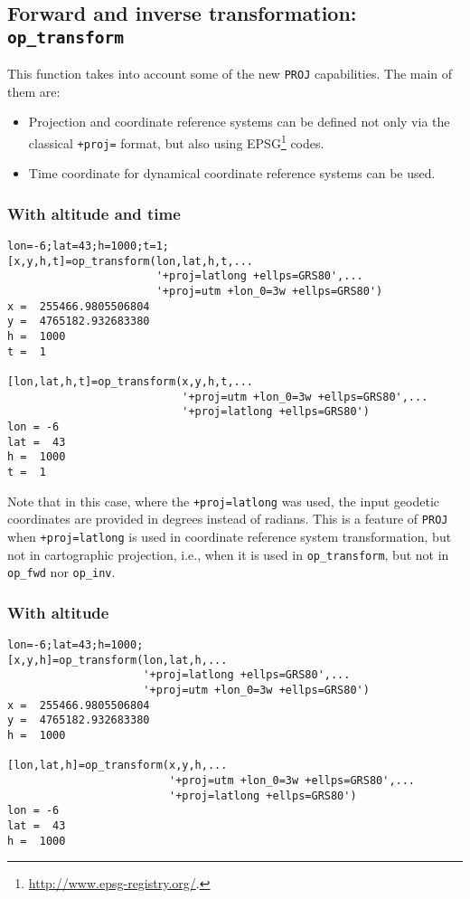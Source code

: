 \documentclass[10pt,a4paper]{article}
\newcommand{\proj}{\texttt{PROJ}}
\begin{document}
\subsection{Forward and inverse transformation: \texttt{op\_transform}}

This function takes into account some of the new \proj{} capabilities. The main
of them are:
\begin{itemize}
\item Projection and coordinate reference systems can be defined not only via
      the classical \texttt{+proj=} format, but also using
      EPSG\footnote{\url{http://www.epsg-registry.org/}.} codes.
\item Time coordinate for dynamical coordinate reference systems can be used.
\end{itemize}

\subsubsection{With altitude and time}

\begin{verbatim}
lon=-6;lat=43;h=1000;t=1;
[x,y,h,t]=op_transform(lon,lat,h,t,...
                       '+proj=latlong +ellps=GRS80',...
                       '+proj=utm +lon_0=3w +ellps=GRS80')
x =  255466.9805506804
y =  4765182.932683380
h =  1000
t =  1

[lon,lat,h,t]=op_transform(x,y,h,t,...
                           '+proj=utm +lon_0=3w +ellps=GRS80',...
                           '+proj=latlong +ellps=GRS80')
lon = -6
lat =  43
h =  1000
t =  1
\end{verbatim}

Note that in this case, where the \texttt{+proj=latlong} was used, the input
geodetic coordinates are provided in degrees instead of radians. This is a
feature of \proj{} when \texttt{+proj=latlong} is used in coordinate reference
system transformation, but not in cartographic projection, i.e., when it is used
in \texttt{op\_transform}, but not in \texttt{op\_fwd} nor  \texttt{op\_inv}.

\subsubsection{With altitude}

\begin{verbatim}
lon=-6;lat=43;h=1000;
[x,y,h]=op_transform(lon,lat,h,...
                     '+proj=latlong +ellps=GRS80',...
                     '+proj=utm +lon_0=3w +ellps=GRS80')
x =  255466.9805506804
y =  4765182.932683380
h =  1000

[lon,lat,h]=op_transform(x,y,h,...
                         '+proj=utm +lon_0=3w +ellps=GRS80',...
                         '+proj=latlong +ellps=GRS80')
lon = -6
lat =  43
h =  1000
\end{verbatim}
\end{document}

